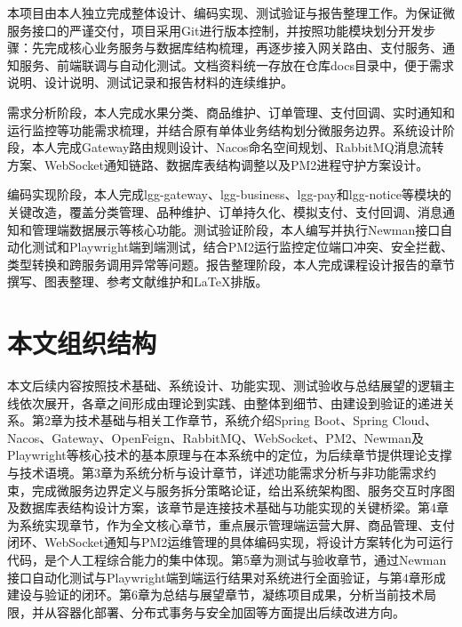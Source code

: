 本项目由本人独立完成整体设计、编码实现、测试验证与报告整理工作。为保证微服务接口的严谨交付，项目采用Git进行版本控制，并按照功能模块划分开发步骤：先完成核心业务服务与数据库结构梳理，再逐步接入网关路由、支付服务、通知服务、前端联调与自动化测试。文档资料统一存放在仓库docs目录中，便于需求说明、设计说明、测试记录和报告材料的连续维护。

需求分析阶段，本人完成水果分类、商品维护、订单管理、支付回调、实时通知和运行监控等功能需求梳理，并结合原有单体业务结构划分微服务边界。系统设计阶段，本人完成Gateway路由规则设计、Nacos命名空间规划、RabbitMQ消息流转方案、WebSocket通知链路、数据库表结构调整以及PM2进程守护方案设计。

编码实现阶段，本人完成lgg-gateway、lgg-business、lgg-pay和lgg-notice等模块的关键改造，覆盖分类管理、品种维护、订单持久化、模拟支付、支付回调、消息通知和管理端数据展示等核心功能。测试验证阶段，本人编写并执行Newman接口自动化测试和Playwright端到端测试，结合PM2运行监控定位端口冲突、安全拦截、类型转换和跨服务调用异常等问题。报告整理阶段，本人完成课程设计报告的章节撰写、图表整理、参考文献维护和LaTeX排版。

\section{本文组织结构}

本文后续内容按照技术基础、系统设计、功能实现、测试验收与总结展望的逻辑主线依次展开，各章之间形成由理论到实践、由整体到细节、由建设到验证的递进关系。第2章为技术基础与相关工作章节，系统介绍Spring Boot、Spring Cloud、Nacos、Gateway、OpenFeign、RabbitMQ、WebSocket、PM2、Newman及Playwright等核心技术的基本原理与在本系统中的定位，为后续章节提供理论支撑与技术语境。第3章为系统分析与设计章节，详述功能需求分析与非功能需求约束，完成微服务边界定义与服务拆分策略论证，给出系统架构图、服务交互时序图及数据库表结构设计方案，该章节是连接技术基础与功能实现的关键桥梁。第4章为系统实现章节，作为全文核心章节，重点展示管理端运营大屏、商品管理、支付闭环、WebSocket通知与PM2运维管理的具体编码实现，将设计方案转化为可运行代码，是个人工程综合能力的集中体现。第5章为测试与验收章节，通过Newman接口自动化测试与Playwright端到端运行结果对系统进行全面验证，与第4章形成建设与验证的闭环。第6章为总结与展望章节，凝练项目成果，分析当前技术局限，并从容器化部署、分布式事务与安全加固等方面提出后续改进方向。
